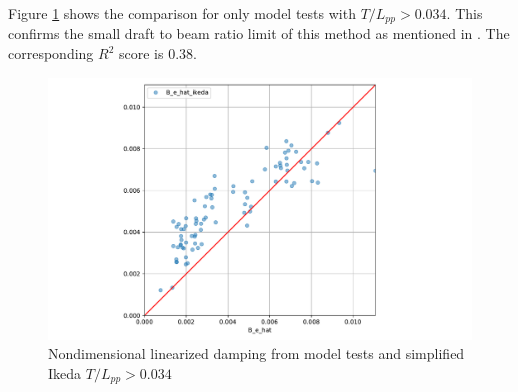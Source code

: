 Figure \ref{fig:B_e_hat_good} shows the comparison for only model tests with $T/L_{pp}>0.034$.
This confirms the small draft to beam ratio limit of this method as mentioned in \cite{kawahara_simple_2011}. The corresponding $R^2$ score is 0.38.

\begin{figure}[H]
    \centering
    \includegraphics[width=\columnwidth]{figures/B_e_hat_good.pdf}
    \caption{Nondimensional linearized damping from model tests and simplified Ikeda $T/L_{pp}>0.034$}
    \label{fig:B_e_hat_good}
\end{figure}
